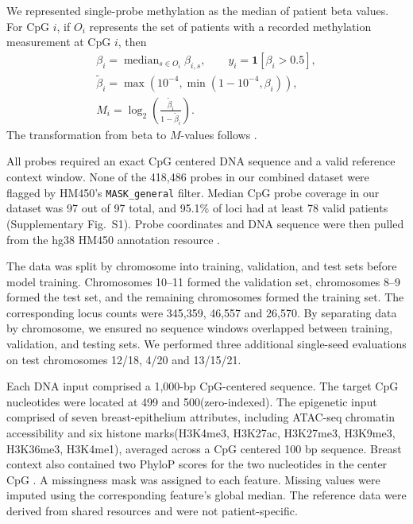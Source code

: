 \documentclass[11pt,letterpaper]{article}
\begin{document}
We represented single-probe methylation as the median of patient beta values. For CpG $i$, if $O_i$ represents the set of patients with a recorded methylation measurement at CpG $i$, then
\begin{gather*}
\beta_i=\operatorname{median}_{s\in O_i}\beta_{i,s},
\qquad y_i=\mathbf{1}[\beta_i>0.5],\\
\widetilde\beta_i=\max\left(10^{-4},\min\left(1-10^{-4},\beta_i\right)\right),\\
M_i=\log_2\left(\frac{\widetilde\beta_i}{1-\widetilde\beta_i}\right).
\end{gather*}
The transformation from beta to $M$-values follows \cite{du2010betamvalue}. 

All probes required an exact CpG centered DNA sequence and a valid reference context window. None of the 418,486 probes in our combined dataset were flagged by HM450's \texttt{MASK\_general} filter. Median CpG probe coverage in our dataset was 97 out of 97 total, and 95.1\% of loci had at least 78 valid patients (Supplementary Fig.~S1). Probe coordinates and DNA sequence were then pulled from the hg38 HM450 annotation resource \cite{zhou2017infinium,chen2013crossreactive}.

The data was split by chromosome into training, validation, and test sets before model training. Chromosomes 10--11 formed the validation set, chromosomes 8--9 formed the test set, and the remaining chromosomes formed the training set. The corresponding locus counts were 345,359, 46,557 and 26,570. By separating data by chromosome, we ensured no sequence windows overlapped between training, validation, and testing sets. We performed three additional single-seed evaluations on test chromosomes 12/18, 4/20 and 13/15/21. 

Each DNA input comprised a 1,000-bp CpG-centered sequence. The target CpG nucleotides were located at 499 and 500(zero-indexed). The epigenetic input comprised of seven breast-epithelium attributes, including ATAC-seq chromatin accessibility and six histone marks(H3K4me3, H3K27ac, H3K27me3, H3K9me3, H3K36me3, H3K4me1), averaged across a CpG centered 100 bp sequence. Breast context also contained two PhyloP scores for the two nucleotides in the center CpG \cite{pollard2010phylop}. A missingness mask was assigned to each feature. Missing values were imputed using the corresponding feature's global median. The reference data were derived from shared resources and were not patient-specific.
\end{document}
